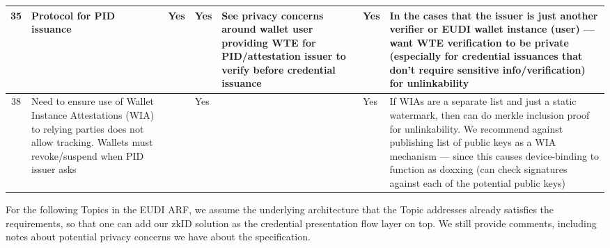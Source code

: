 \begin{longtable}{|c|p{}|p{}|p{}|p{}|p{}|p{}|}
35 & Protocol for PID issuance & Yes & Yes & See privacy concerns around wallet user providing WTE for PID/attestation issuer to verify before credential issuance & Yes & In the cases that the issuer is just another verifier or EUDI wallet instance (user) — want WTE verification to be private (especially for credential issuances that don't require sensitive info/verification) for unlinkability \\
\hline

38 & Need to ensure use of Wallet Instance Attestations (WIA) to relying parties does not allow tracking. Wallets must revoke/suspend when PID issuer asks & & Yes & & Yes & If WIAs are a separate list and just a static watermark, then can do merkle inclusion proof for unlinkability. We recommend against publishing list of public keys as a WIA mechanism — since this causes device-binding to function as doxxing (can check signatures against each of the potential public keys) \\
\hline


\hline


\end{longtable}

For the following Topics in the EUDI ARF, we assume the underlying architecture that the Topic addresses already satisfies the requirements, so that one can add our zkID solution as the credential presentation flow layer on top. We still provide comments, including notes about potential privacy concerns we have about the specification.  

